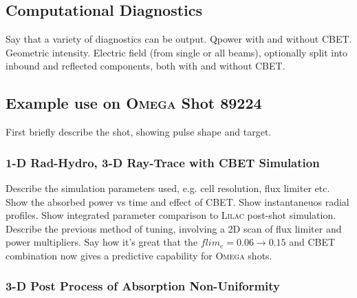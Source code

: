 \subsection{Computational Diagnostics}

Say that a variety of diagnostics can be output.
Qpower with and without CBET.
Geometric intensity.
Electric field (from single or all beams), optionally split into inbound and reflected components, both with and without CBET.

\subsection{Example use on \textsc{Omega} Shot 89224}

First briefly describe the shot, showing pulse shape and target.

\subsubsection{1-D Rad-Hydro, 3-D Ray-Trace with CBET Simulation}

Describe the simulation parameters used, e.g. cell resolution, flux limiter etc.
Show the absorbed power vs time and effect of CBET.
Show instantaneuos radial profiles.
Show integrated parameter comparison to \textsc{Lilac} post-shot simulation.
Describe the previous method of tuning, involving a 2D scan of flux limiter and power multipliers.
Say how it's great that the $flim_e = 0.06 \rightarrow 0.15$ and CBET combination now gives a predictive capability for \textsc{Omega} shots.

\subsubsection{3-D Post Process of Absorption Non-Uniformity}

